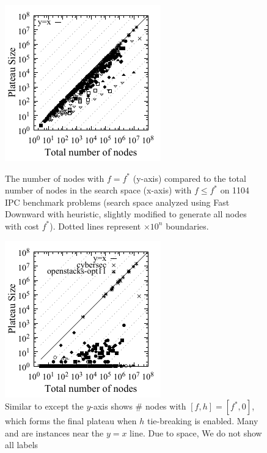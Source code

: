 \begin{figure}[bt]
 \newcommand{\minilength}{0.36\textwidth}
 \newcommand{\minisep}{0.02\textwidth}
 \begin{minipage}[t]{\minilength}
  \centering
 \includegraphics{tables/aaai16-frontier/aaai16prelim3/lmcut_frontier_noh-front-mono.pdf}
 \caption{
 The number of nodes with $f=f^*$ (y-axis) compared to the
 total number of nodes in the search space (x-axis) with $f\leq f^*$ on 1104 IPC benchmark problems
  (search space analyzed using Fast Downward with \lmcut heuristic,
  slightly modified to generate all nodes with cost $f^*$).
  Dotted lines represent $\times 10^n$ boundaries.
  }
 \label{fig:plateau-noh}
 \end{minipage}
 \hfill
 \begin{minipage}[t]{\minilength}
  \centering
  \includegraphics{tables/aaai16-frontier/aaai16prelim3/lmcut_frontier-front-mono.pdf}
  \caption{
  Similar to  except the $y$-axis shows
  \# nodes with $[f,h]=[f^*,0]$, which forms the final
  plateau when $h$ tie-breaking is enabled.
  Many  and  are instances near the $y=x$ line.
  Due to space, We do not show all labels
}
\end{minipage}
\end{figure}
